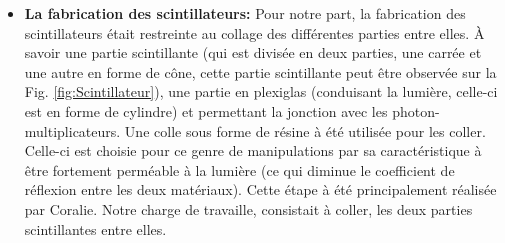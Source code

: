 \documentclass[12pt]{article}
\begin{document}
\begin{itemize}
    \item \textbf{La fabrication des scintillateurs: } Pour notre part, la fabrication des scintillateurs était restreinte au collage des différentes parties entre elles. À savoir une partie scintillante (qui est divisée en deux parties, une carrée et une autre en forme de cône, cette partie scintillante peut être observée sur la Fig. \ref{fig:Scintillateur}),  une partie en plexiglas (conduisant la lumière, celle-ci est en forme de cylindre) et permettant la jonction avec les photon-multiplicateurs. Une colle sous forme de résine à été utilisée pour les coller. Celle-ci est choisie pour ce genre de manipulations par sa caractéristique à être fortement perméable à la lumière (ce qui diminue le coefficient de réflexion entre les deux matériaux). Cette étape à été principalement réalisée par Coralie. Notre charge de travaille, consistait à coller, les deux parties scintillantes entre elles. 
    

\end{itemize}
\end{document}
